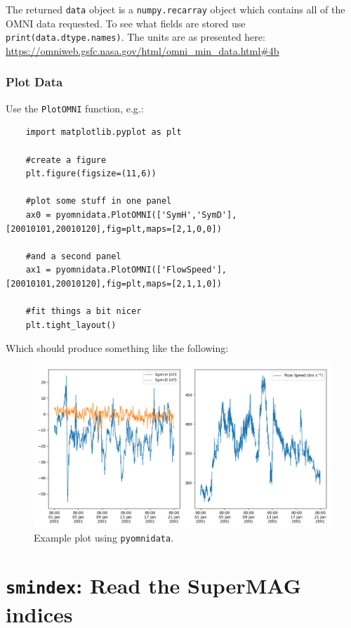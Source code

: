 	The returned \texttt{data} object is a \texttt{numpy.recarray} object which contains all of the OMNI data requested. To see what fields are stored use \texttt{print(data.dtype.names)}. The units are as presented here: \url{https://omniweb.gsfc.nasa.gov/html/omni_min_data.html#4b}
	
	\subsubsection{Plot Data}
	
	Use the \texttt{PlotOMNI} function, e.g.:
	
	\begin{verbatim}
	import matplotlib.pyplot as plt
	
	#create a figure
	plt.figure(figsize=(11,6))
	
	#plot some stuff in one panel
	ax0 = pyomnidata.PlotOMNI(['SymH','SymD'],[20010101,20010120],fig=plt,maps=[2,1,0,0])
	
	#and a second panel
	ax1 = pyomnidata.PlotOMNI(['FlowSpeed'],[20010101,20010120],fig=plt,maps=[2,1,1,0])
	
	#fit things a bit nicer
	plt.tight_layout()
	\end{verbatim}
	
	Which should produce something like the following:
	
	\begin{figure}[H]
	  \centering
	  \includegraphics[width=\textwidth]{figures/ch5_omniexample.png}
	  \caption{Example plot using \texttt{pyomnidata}.}
	\end{figure}
	
	
	


	\section{\texttt{smindex}: Read the SuperMAG indices}


